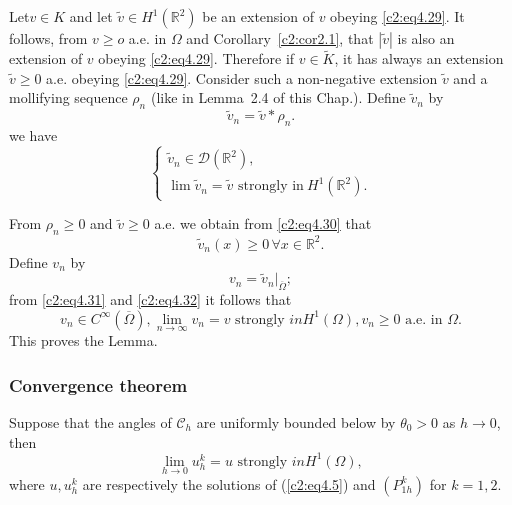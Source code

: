 Let\pageoriginale  $v \in K$ and let $\tilde{v} \in H^1 (\mathbb{R}^2)$ be
an extension of $v$ obeying \eqref{c2:eq4.29}. It  follows, from $v
\geq o$ a.e. in $\Omega$ and Corollary~\ref{c2:cor2.1}, that
$|\tilde{v}|$ is also an  extension of $v$ obeying
\eqref{c2:eq4.29}. Therefore if $v \in \tilde{K}$, 
it has always an extension $\tilde{v} \geq 0$ a.e. obeying
\eqref{c2:eq4.29}. Consider such a non-negative extension $\tilde{v}$  
and a mollifying  sequence $\rho_n$ (like in Lemma~2.4 of this 
Chap.). Define $\tilde{v}_n$ by  
\begin{equation}
\tilde{v}_n = \tilde{v}* \rho_n. \tag{4.30}\label{c2:eq4.30}
\end{equation}
we have 
\begin{equation}
\begin{cases}
\tilde{v}_n \in \mathscr{D} (\mathbb{R}^2), \\
\lim \tilde{v}_n = \tilde{v} \text{ strongly in}~ H^1
(\mathbb{R}^2). \tag{4.31}\label{c2:eq4.31} 
\end{cases}
\end{equation}

From $\rho_n \geq 0$ and $\tilde{v} \geq 0$ a.e. we obtain from \eqref{c2:eq4.30} that 
\begin{equation}
\tilde{v}_n (x) \geq 0\, \forall  x \in
\mathbb{R}^2.\tag{4.32}\label{c2:eq4.32}  
\end{equation}
Define $v_n$ by 
$$
v_n = \tilde{v}_n |_{\overline{\Omega}};
$$
from \eqref{c2:eq4.31} and \eqref{c2:eq4.32} it follows that 
$$
v_n \in C^\infty (\overline{\Omega}), \lim_{n \to \infty}v_n = v
\text{ strongly }in H^1 (\Omega), v_n \geq 0 \text{ a.e.  in }
\Omega. 
$$
This proves the Lemma.

\subsubsection{Convergence theorem}\label{c2:sss4.5.2}

\begin{theorem}\label{c2:thm4.3}%
Suppose that the  angles of $\mathscr{C}_h$ are uniformly bounded
below by $\theta_0 > 0$ as $h \to 0$, then  
\begin{equation}
\lim_{h \to 0} u^k_h = u \text{ strongly } in H^1(\Omega),
\tag{4.33}\label{c2:eq4.33}  
\end{equation}
where $u, u^k_h$ are respectively the solutions of (\ref{c2:eq4.5}) and
$(P^k_{1h})$  for $k=1, 2$. 
\end{theorem}

